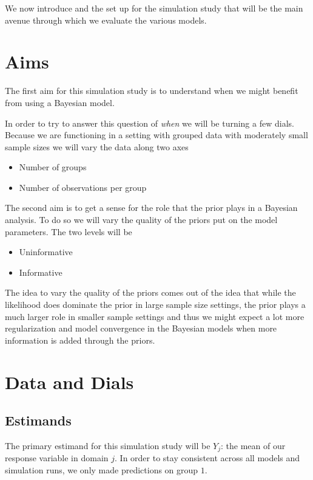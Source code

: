 \documentclass[12pt,twoside]{reedthesis}
\providecommand{\tightlist}{%
  \setlength{\itemsep}{0pt}\setlength{\parskip}{0pt}}
\begin{document}
We now introduce and the set up for the simulation study that will be the main avenue through which we evaluate the various models.

\hypertarget{aims}{%
\section{Aims}\label{aims}}

The first aim for this simulation study is to understand when we might benefit from using a Bayesian model.

In order to try to answer this question of \emph{when} we will be turning a few dials. Because we are functioning in a setting with grouped data with moderately small sample sizes we will vary the data along two axes
\begin{itemize}
\tightlist
\item
  Number of groups
\item
  Number of observations per group
\end{itemize}
The second aim is to get a sense for the role that the prior plays in a Bayesian analysis. To do so we will vary the quality of the priors put on the model parameters. The two levels will be
\begin{itemize}
\tightlist
\item
  Uninformative
\item
  Informative
\end{itemize}
The idea to vary the quality of the priors comes out of the idea that while the likelihood does dominate the prior in large sample size settings, the prior plays a much larger role in smaller sample settings and thus we might expect a lot more regularization and model convergence in the Bayesian models when more information is added through the priors.

\hypertarget{data-and-dials}{%
\section{Data and Dials}\label{data-and-dials}}

\hypertarget{estimands}{%
\subsection{Estimands}\label{estimands}}

The primary estimand for this simulation study will be \(Y_j\): the mean of our response variable in domain \(j\). In order to stay consistent across all models and simulation runs, we only made predictions on group \(1\).
\end{document}
